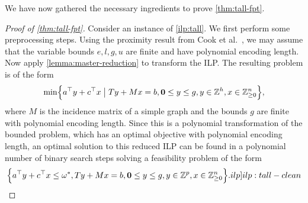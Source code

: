 \documentclass[a4paper,UKenglish,cleveref,thm-restate]{lipics-v2021}
\newcommand{\Z}{\mathbb Z}
\newcommand{\veczero}{\mathbf0}
\begin{document}
We have now gathered the necessary ingredients to prove \cref{thm:tall-fpt}.

\begin{proof}[Proof of \cref{thm:tall-fpt}]
    Consider an instance of \cref{ilp:tall}. We first perform some preprocessing steps. Using the proximity result from Cook et al.~\cite{DBLP:journals/mp/CookGST86}, we may assume that the variable bounds $e,l,g,u$ are finite and have polynomial encoding length. Now apply \cref{lemma:master-reduction} to transform the ILP. The resulting problem is of the form
    \[
        \min\Bigl\{a^\top y+c^\top x\bigm\vert Ty+Mx=b,\veczero\le y\le g,y\in\Z^h,x\in\mathbb Z_{\ge0}^n\Bigr\},
    \]
    where $M$ is the incidence matrix of a simple graph and the bounds $g$ are finite with polynomial encoding length. Since this is a polynomial transformation of the bounded problem, which has an optimal objective with polynomial encoding length, an optimal solution to this reduced ILP can be found in a polynomial number of binary search steps solving a feasibility problem of the form
    \begin{equation}
        \Bigl\{a^\top y+c^\top x\le\omega^*,Ty+Mx=b,\veczero\le y\le g,y\in\Z^p,x\in\mathbb Z_{\ge0}^n\Bigr\}.
        \label[ilp]{ilp:tall-clean}
    \end{equation}


\end{proof}
\end{document}
